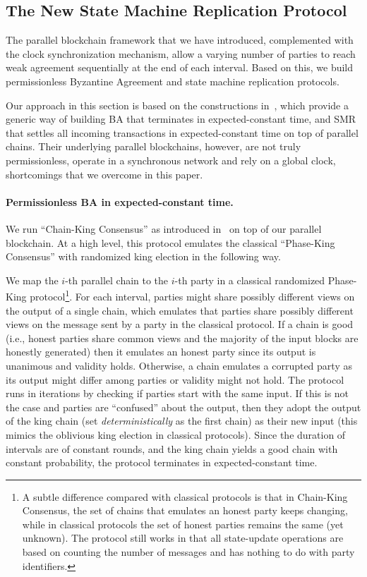 \subsection{The New State Machine Replication Protocol}
\label{subsec:new-smr-protocol}

The parallel blockchain framework that we have introduced, complemented with the clock synchronization mechanism, allow a varying number of parties to reach weak agreement sequentially at the end of each interval.
%
Based on this, we build permissionless Byzantine Agreement and state machine replication protocols.

Our approach in this section is based on the constructions in~\cite{EC:GarKiaShe24}, which provide a generic way of building BA that terminates in expected-constant time, and SMR that settles all incoming transactions in expected-constant time on top of parallel chains.
%
Their underlying parallel blockchains, however, are not truly permissionless, operate in a synchronous network and rely on a global clock, shortcomings that we overcome in this paper.

\paragraph{Permissionless BA in expected-constant time.}
%
We run ``Chain-King Consensus'' as introduced in~\cite{EC:GarKiaShe24} on top of our parallel blockchain.
%
At a high level, this protocol emulates the classical ``Phase-King Consensus'' \cite{ICALP:BerGar89,FOCS:BerGarPer89} with randomized king election \cite{PODC:FitGar03,C:KatKoo06} in the following way.

We map the $i$-th parallel chain to the $i$-th party in a classical randomized Phase-King protocol\footnote{A subtle difference compared with classical protocols is that in Chain-King Consensus, the set of chains that emulates an honest party keeps changing, while in classical protocols the set of honest parties remains the same (yet unknown). The protocol still works in that all state-update operations are based on counting the number of messages and has nothing to do with party identifiers.}.
%
For each interval, parties might share possibly different views on the output of a single chain, which emulates that parties share possibly different views on the message sent by a party in the classical protocol.
%
If a chain is good (i.e., honest parties share common views and the majority of the input blocks are honestly generated) then it emulates an honest party since its output is unanimous and validity holds.
%
Otherwise, a chain emulates a corrupted party as its output might differ among parties or validity might not hold.
%
The protocol runs in iterations by checking if parties start with the same input.
%
If this is not the case and parties are ``confused'' about the output, then they adopt the output of the king chain (set \emph{deterministically} as the first chain) as their new input (this mimics the oblivious king election in classical protocols).
%
Since the duration of intervals are of constant rounds, and the king chain yields a good chain with constant probability, the protocol terminates in expected-constant time.

